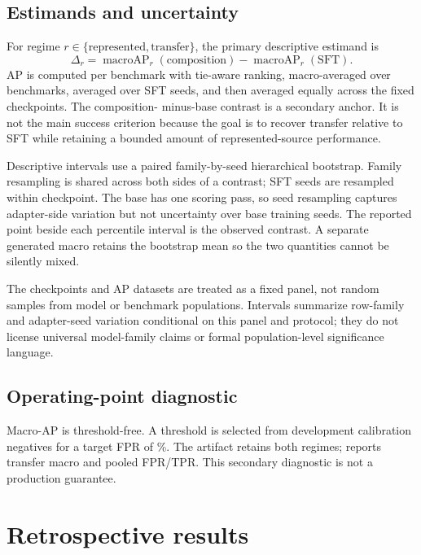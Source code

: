 \documentclass[11pt]{article}
\begin{document}
\subsection{Estimands and uncertainty}

For regime $r\in\{\mathrm{represented},\mathrm{transfer}\}$, the primary descriptive estimand is
\begin{equation}
  \Delta_r = \operatorname{macroAP}_r(\mathrm{composition})
             - \operatorname{macroAP}_r(\mathrm{SFT}).
\end{equation}
AP is computed per benchmark with tie-aware ranking, macro-averaged over benchmarks, averaged
over SFT seeds, and then averaged equally across the \PilotNModels{} fixed checkpoints.  The composition-
minus-base contrast is a secondary anchor.  It is not the main success criterion because the goal
is to recover transfer relative to SFT while retaining a bounded amount of represented-source
performance.

Descriptive intervals use a paired family-by-seed hierarchical bootstrap.  Family resampling is
shared across both sides of a contrast; SFT seeds are resampled within checkpoint.  The base has
one scoring pass, so seed resampling captures adapter-side variation but not uncertainty over base
training seeds.  The reported point beside each percentile interval is the observed contrast.  A
separate generated macro retains the bootstrap mean so the two quantities cannot be silently
mixed.

The \PilotNModels{} checkpoints and \PilotNAPDatasets{} AP datasets are treated as a fixed panel, not random samples from
model or benchmark populations.  Intervals summarize row-family and adapter-seed variation
conditional on this panel and protocol; they do not license universal model-family claims or
formal population-level significance language.

\subsection{Operating-point diagnostic}

Macro-AP is threshold-free.  A threshold is selected from development calibration negatives for a
target FPR of \PilotTargetFPRPct\%.  The artifact retains both regimes; 
reports transfer macro and pooled FPR/TPR.  This secondary diagnostic is not a production guarantee.

\section{Retrospective results}
\label{sec:results}
\end{document}
